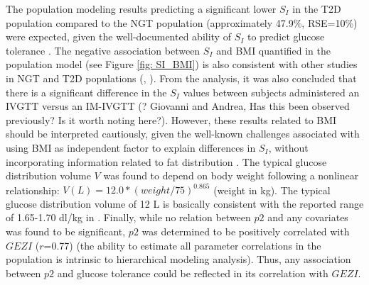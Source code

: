 \documentclass[utf8]{frontiersSCNS} %
\begin{document}
The population modeling results predicting a significant lower $S_I$ in the T2D population compared to the NGT population (approximately 47.9\%, RSE=10\%) were expected, given the well-documented ability of $S_I$ to predict glucose tolerance \citep{Bergman1997TheTolerance}. The negative association between $S_I$ and BMI quantified in the population model (see Figure \ref{fig: SI_BMI}) is also consistent with other studies in NGT and T2D populations (\citet{welch_1990}, \citet{Morettini_2019}). From the analysis, it was also concluded that there is a significant difference in the $S_I$ values between subjects administered an IVGTT versus an IM-IVGTT (? Giovanni and Andrea, Has this been observed previously? Is it worth noting here?). However, these results related to BMI should be interpreted cautiously, given the well-known challenges associated with using BMI as independent factor to explain differences in $S_I$, without incorporating information related to fat distribution \citep{Klein_2007}. The typical glucose distribution volume $V$ was found to depend on body weight following a nonlinear relationship: $V (L)=12.0*(weight/75)^{0.865}$ (weight in kg). The typical glucose distribution volume of 12 L is basically consistent with the reported range of 1.65-1.70 dl/kg in \citet{Denti2010}. Finally, while no relation between $p2$ and any covariates was found to be significant, $p2$ was determined to be positively correlated with $GEZI$ ($r$=0.77) (the ability to estimate all parameter correlations in the population is intrinsic to hierarchical modeling analysis). Thus, any association between $p2$ and glucose tolerance could be reflected in its correlation with $GEZI$.
\end{document}
